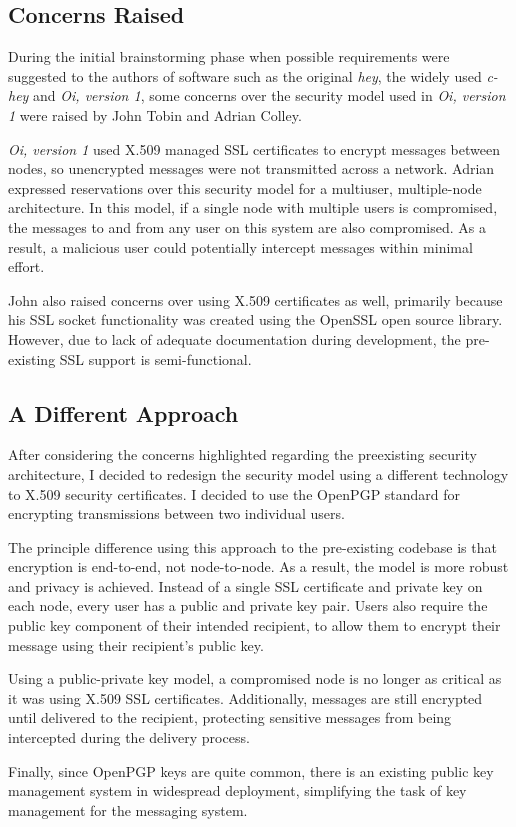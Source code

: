 
\subsection{Concerns Raised}

During the initial brainstorming phase when possible requirements were
suggested to the authors of software such as the original \emph{hey},
the widely used \emph{c-hey} and \emph{Oi, version 1}, some concerns 
over the security model used in \emph{Oi, version 1} were raised by 
John Tobin and Adrian Colley. 


\emph{Oi, version 1} used X.509 managed SSL certificates to encrypt 
messages between nodes, so unencrypted messages were not transmitted 
across a network. Adrian expressed reservations over this security model 
for a multiuser, multiple-node architecture. In this model, if a
single node with multiple users is compromised, the messages to and from
any user on this system are also compromised. As a result, a malicious
user could potentially intercept messages within minimal effort.


John also raised concerns over using X.509 certificates as well,
primarily because his SSL socket functionality was created using the
OpenSSL open source library. However, due to lack of adequate
documentation during development, the pre-existing SSL support is
semi-functional.

\subsection{A Different Approach}

After considering the concerns highlighted regarding the preexisting
security architecture, I decided to redesign the security model using a
different technology to X.509 security certificates. I decided to use the 
OpenPGP standard for encrypting transmissions between two individual 
users.


The principle difference using this approach to the pre-existing
codebase is that encryption is end-to-end, not node-to-node. As a
result, the model is more robust and privacy is achieved. Instead of a
single SSL certificate and private key on each node, every user has a
public and private key pair. Users also require the public key component
of their intended recipient, to allow them to encrypt their message using
their recipient's public key.


Using a public-private key model, a compromised node is no longer as
critical as it was using X.509 SSL certificates. Additionally, messages
are still encrypted until delivered to the recipient, protecting
sensitive messages from being intercepted during the delivery process.


Finally, since OpenPGP keys are quite common, there is an existing
public key management system in widespread deployment, simplifying the
task of key management for the messaging system.
